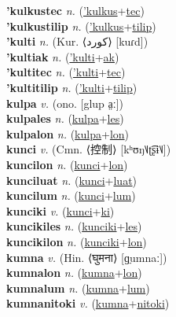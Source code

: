 \textbf{'kulkustec} \textit{n.} (\hyperref['kulkus]{'kulkus}+\hyperref[tec]{tec})
 \label{'kulkustec} \\
\textbf{'kulkustilip} \textit{n.} (\hyperref['kulkus]{'kulkus}+\hyperref[tilip]{tilip})
 \label{'kulkustilip} \\
\textbf{'kulti} \textit{n.} (Kur. ⟨کورد‎⟩ [kuɾd])
 \label{'kulti} \\
\textbf{'kultiak} \textit{n.} (\hyperref['kulti]{'kulti}+\hyperref[ak]{ak})
 \label{'kultiak} \\
\textbf{'kultitec} \textit{n.} (\hyperref['kulti]{'kulti}+\hyperref[tec]{tec})
 \label{'kultitec} \\
\textbf{'kultitilip} \textit{n.} (\hyperref['kulti]{'kulti}+\hyperref[tilip]{tilip})
 \label{'kultitilip} \\
\textbf{kulpa} \textit{v.} (ono. [glup a̤ː])
 \label{kulpa} \\
\textbf{kulpales} \textit{n.} (\hyperref[kulpa]{kulpa}+\hyperref[les]{les})
 \label{kulpales} \\
\textbf{kulpalon} \textit{n.} (\hyperref[kulpa]{kulpa}+\hyperref[lon]{lon})
 \label{kulpalon} \\
\textbf{kunci} \textit{v.} (Cmn. ⟨控制⟩ [kʰʊŋ˥˩ʈ͡ʂɨ˥˩])
 \label{kunci} \\
\textbf{kuncilon} \textit{n.} (\hyperref[kunci]{kunci}+\hyperref[lon]{lon})
 \label{kuncilon} \\
\textbf{kunciluat} \textit{n.} (\hyperref[kunci]{kunci}+\hyperref[luat]{luat})
 \label{kunciluat} \\
\textbf{kuncilum} \textit{n.} (\hyperref[kunci]{kunci}+\hyperref[lum]{lum})
 \label{kuncilum} \\
\textbf{kunciki} \textit{v.} (\hyperref[kunci]{kunci}+\hyperref[ki]{ki})
 \label{kunciki} \\
\textbf{kuncikiles} \textit{n.} (\hyperref[kunciki]{kunciki}+\hyperref[les]{les})
 \label{kuncikiles} \\
\textbf{kuncikilon} \textit{n.} (\hyperref[kunciki]{kunciki}+\hyperref[lon]{lon})
 \label{kuncikilon} \\
\textbf{kumna} \textit{v.} (Hin. ⟨घुमना⟩ [ɡ̤umnaː])
 \label{kumna} \\
\textbf{kumnalon} \textit{n.} (\hyperref[kumna]{kumna}+\hyperref[lon]{lon})
 \label{kumnalon} \\
\textbf{kumnalum} \textit{n.} (\hyperref[kumna]{kumna}+\hyperref[lum]{lum})
 \label{kumnalum} \\
\textbf{kumnanitoki} \textit{v.} (\hyperref[kumna]{kumna}+\hyperref[nitoki]{nitoki})
